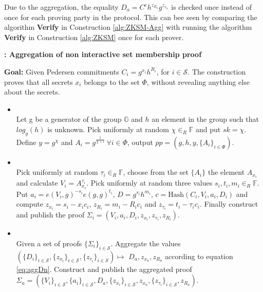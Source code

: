 Due to the aggregation, the equality $D_a=C^ch^{z_{R_a}}g^{z_{x_a}}$ is checked once instead of once for each proving party in the protocol. This can bee seen by comparing the algorithm \textbf{Verify} in Construction \ref{alg:ZKSM-Agg} with running the algorithm \textbf{Verify} in Construction \ref{alg:ZKSM} once for each prover. 

\begin{algorithm}[]
\caption{\textbf{: Aggregation of non interactive set membership proof}}
\textbf{Goal:}  Given  Pedersen commitments $C_i=g^{x_i} h^{R_i}$, for $i\in\mathcal{S}$. The construction  proves that all secrets $x_i$ belongs to the set $\Phi$, without revealing anything else about the secrets.
\vspace{2pt} 
\hline 
\vspace{2pt}
\begin{itemize}
  \item{}\\
 Let g be a generator of the group $\mathds{G}$ and $h$ an element in the group such that $log_g(h)$ is unknown.  
Pick uniformly at random $\chi\in_R\mathds{F}$ and put $sk=\chi$. Define $y=g^\chi$ and $A_i=g^{\frac{1}{\chi+i}} \:\forall i\in\Phi$, output $pp=(g,h,y,\{A_i\}_{i\in\Phi})$.

\item{}\\
Pick uniformly at random $\tau_i\in_R\mathds{F}$, choose from the set $\{A_i\}$ the element $A_{x_i}$ and calculate $V_i=A_{x_i}^{\tau_i}$. Pick uniformly at random three values $s_i,t_i,m_i\in_R\mathds{F}$. Put $a_i=e(V_i,g)^{-s_i}e(g,g)^{t_i}$,  $D=g^{s_i}h^{m_i}$, $c=\text{Hash}(C_i,V_i,a_i,D_i)$ and compute $z_{x_i} = s_i-x_i c_i$, $z_{R_i} = m_i-R_ic_i$ and $z_{\tau_i}= t_i-\tau_i c_i$.  Finally construct and publish the proof $\Sigma_i = (V_i,a_i,D_i,z_{x_i},z_{\tau_i},z_{R_i})$.

\item {} \\
Given a set of proofs  $\{\Sigma_i\}_{i\in\mathcal{S}}$. Aggregate the values $( \{D_i \}_{i\in\mathcal{S} }, \{ z_{x_i}\}_{i\in\mathcal{S} }, \{ z_{r_i}\}_{i\in\mathcal{S}  }) \mapsto$ $ D_a,z_{x_a},z_{R_a}$ according to equation \eqref{eq:aggDn}. Construct and publish the aggregated proof $\Sigma_a = (\{V_i\}_{i\in\mathcal{S} },\{a_i\}_{i\in\mathcal{S} },D_a,\{z_{x_i}\}_{i\in\mathcal{S} }, z_{x_a}, \{z_{\tau_i}\}_{i\in\mathcal{S} },z_{R_a})$.


\end{itemize}
\end{algorithm}
